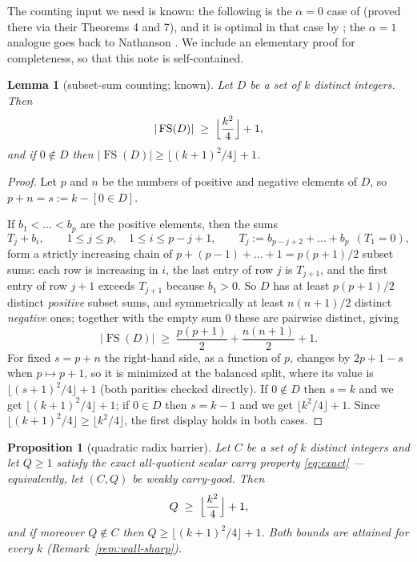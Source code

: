 \documentclass[11pt]{article}
\newtheorem{proposition}{Proposition}
\newtheorem{lemma}{Lemma}[section]
\theoremstyle{definition}
\theoremstyle{remark}
\newcommand{\FS}{\operatorname{FS}}
\begin{document}
The counting input we need is known: the following is the $\alpha=0$ case
of \cite[Corollary~9]{BP22} (proved there via their Theorems 4 and 7),
and it is optimal in that case by \cite[Remark~10]{BP22}; the $\alpha=1$
analogue goes back to Nathanson \cite[Theorem~3]{Nathanson95}. We include
an elementary proof for completeness, so that this note is
self-contained.

\begin{lemma}[subset-sum counting; known]\label{lem:count}
Let $D$ be a set of $k$ distinct integers. Then
\[
|\FS(D)|\;\ge\;\Bigl\lfloor\frac{k^2}{4}\Bigr\rfloor+1,
\]
and if $0\notin D$ then
$|\FS(D)|\ge\bigl\lfloor(k+1)^2/4\bigr\rfloor+1$.
\end{lemma}

\begin{proof}
Let $p$ and $n$ be the numbers of positive and negative elements of $D$,
so $p+n=s:=k-[0\in D]$.

If $b_1<\dots<b_p$ are the positive elements, then the sums
\[
T_j+b_i,\qquad 1\le j\le p,\quad 1\le i\le p-j+1,
\qquad T_j:=b_{p-j+2}+\dots+b_p\ \ (T_1=0),
\]
form a strictly increasing chain of $p+(p-1)+\dots+1=p(p+1)/2$ subset
sums: each row is increasing in $i$, the last entry of row $j$ is
$T_{j+1}$, and the first entry of row $j+1$ exceeds $T_{j+1}$ because
$b_1>0$. So $D$ has at least $p(p+1)/2$ distinct \emph{positive} subset
sums, and symmetrically at least $n(n+1)/2$ distinct \emph{negative}
ones; together with the empty sum $0$ these are pairwise distinct, giving
\[
|\FS(D)|\;\ge\;\frac{p(p+1)}{2}+\frac{n(n+1)}{2}+1 .
\]
For fixed $s=p+n$ the right-hand side, as a function of $p$, changes by
$2p+1-s$ when $p\mapsto p+1$, so it is minimized at the balanced split,
where its value is $\lfloor(s+1)^2/4\rfloor+1$ (both parities checked
directly). If $0\notin D$ then $s=k$ and we get
$\lfloor(k+1)^2/4\rfloor+1$; if $0\in D$ then $s=k-1$ and we get
$\lfloor k^2/4\rfloor+1$. Since
$\lfloor(k+1)^2/4\rfloor\ge\lfloor k^2/4\rfloor$, the first display holds
in both cases.
\end{proof}

\begin{proposition}[quadratic radix barrier]\label{prop:wall}
Let $C$ be a set of $k$ distinct integers and let $Q\ge1$ satisfy the
exact \emph{all-quotient} scalar carry property \eqref{eq:exact} ---
equivalently, let $(C,Q)$ be weakly carry-good. Then
\[
Q\;\ge\;\Bigl\lfloor\frac{k^2}{4}\Bigr\rfloor+1 ,
\]
and if moreover $Q\notin C$ then
$Q\ge\bigl\lfloor(k+1)^2/4\bigr\rfloor+1$. Both bounds are attained for
every $k$ (Remark~\ref{rem:wall-sharp}).
\end{proposition}
\end{document}
